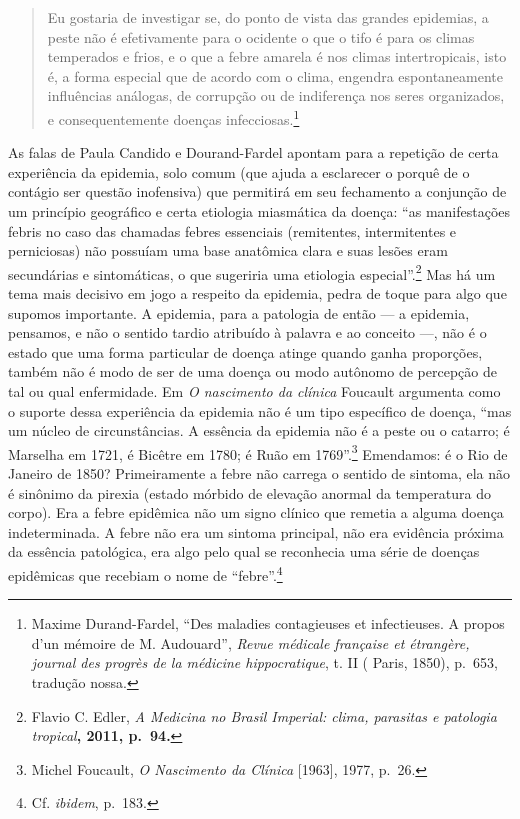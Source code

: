 \begin{quote}
Eu gostaria de investigar se, do ponto de vista das grandes epidemias, a
peste não é efetivamente para o ocidente o que o tifo é para os climas
temperados e frios, e o que a febre amarela é nos climas intertropicais,
isto é, a forma especial que de acordo com o clima, engendra
espontaneamente influências análogas, de corrupção ou de indiferença nos
seres organizados, e consequentemente doenças infecciosas.\footnote{Maxime
  Durand-Fardel, ``Des maladies contagieuses et infectieuses. A propos
  d'un mémoire de M. Audouard'', \textit{Revue médicale française et
  étrangère, journal des progrès de la médicine hippocratique}, t. II (
  Paris, 1850), p.~653, tradução nossa.}
\end{quote}

As falas de Paula Candido e Dourand-Fardel apontam para a repetição de
certa experiência da epidemia, solo comum (que ajuda a esclarecer o
porquê de o contágio ser questão inofensiva) que permitirá em seu
fechamento a conjunção de um princípio geográfico e certa etiologia
miasmática da doença: ``as manifestações febris no caso das chamadas
febres essenciais (remitentes, intermitentes e perniciosas) não possuíam
uma base anatômica clara e suas lesões eram secundárias e sintomáticas,
o que sugeriria uma etiologia especial''.\footnote{Flavio C. Edler,
  \textit{A Medicina no Brasil Imperial: clima, parasitas e patologia
  tropical}\textbf{, 2011, p.~94.}} Mas há um tema mais decisivo em jogo
a respeito da epidemia, pedra de toque para algo que supomos importante.
A epidemia, para a patologia de então --- a epidemia, pensamos, e não o
sentido tardio atribuído à palavra e ao conceito ---, não é o estado que
uma forma particular de doença atinge quando ganha proporções, também
não é modo de ser de uma doença ou modo autônomo de percepção de tal ou
qual enfermidade. Em \textit{O nascimento da clínica} Foucault argumenta
como o suporte dessa experiência da epidemia não é um tipo específico de
doença, ``mas um núcleo de circunstâncias. A essência da epidemia não é
a peste ou o catarro; é Marselha em 1721, é Bicêtre em 1780; é Ruão em
1769''.\footnote{Michel Foucault, \textit{O Nascimento da Clínica}
  {[}1963{]}, 1977, p.~26.} Emendamos: é o Rio de Janeiro de 1850?
Primeiramente a febre não carrega o sentido de sintoma, ela não é
sinônimo da pirexia (estado mórbido de elevação anormal da temperatura
do corpo). Era a febre epidêmica não um signo clínico que remetia a
alguma doença indeterminada. A febre não era um sintoma principal, não
era evidência próxima da essência patológica, era algo pelo qual se
reconhecia uma série de doenças epidêmicas que recebiam o nome de
``febre''.\footnote{Cf. \textit{ibidem}, p.~183.}

